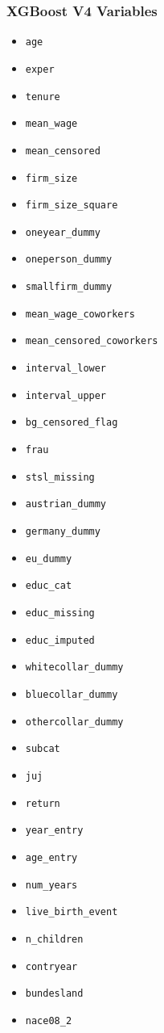 \documentclass{article}
\begin{document}
\subsubsection{XGBoost V4 Variables}

\begin{itemize}
    \item \texttt{age}
    \item \texttt{exper}
    \item \texttt{tenure}
    \item \texttt{mean\_wage}
    \item \texttt{mean\_censored}
    \item \texttt{firm\_size}
    \item \texttt{firm\_size\_square}
    \item \texttt{oneyear\_dummy}
    \item \texttt{oneperson\_dummy}
    \item \texttt{smallfirm\_dummy}
    \item \texttt{mean\_wage\_coworkers}
    \item \texttt{mean\_censored\_coworkers}
    \item \texttt{interval\_lower}
    \item \texttt{interval\_upper}
    \item \texttt{bg\_censored\_flag}
    \item \texttt{frau}
    \item \texttt{stsl\_missing}
    \item \texttt{austrian\_dummy}
    \item \texttt{germany\_dummy}
    \item \texttt{eu\_dummy}
    \item \texttt{educ\_cat}
    \item \texttt{educ\_missing}
    \item \texttt{educ\_imputed}
    \item \texttt{whitecollar\_dummy}
    \item \texttt{bluecollar\_dummy}
    \item \texttt{othercollar\_dummy}
    \item \texttt{subcat}
    \item \texttt{juj}
    \item \texttt{return}
    \item \texttt{year\_entry}
    \item \texttt{age\_entry}
    \item \texttt{num\_years}
    \item \texttt{live\_birth\_event}
    \item \texttt{n\_children}
    \item \texttt{contryear}
    \item \texttt{bundesland}
    \item \texttt{nace08\_2}
\end{itemize}
\end{document}
